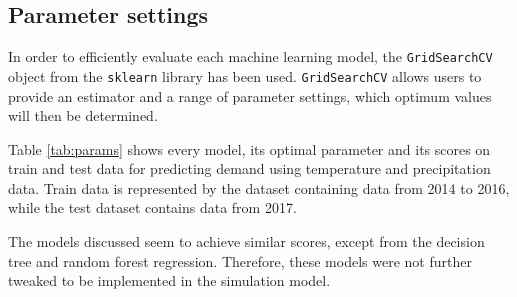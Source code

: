 \documentclass[final,authoryear,5p,times,twocolumn, 11pt]{elsarticle}
\begin{document}
\subsection{Parameter settings}
In order to efficiently evaluate each machine learning model, the \texttt{GridSearchCV} object from the \texttt{sklearn} library has been used. \texttt{GridSearchCV} allows users to provide an estimator and a range of parameter settings, which optimum values will then be determined. 

Table \ref{tab:params} shows every model, its optimal parameter and its scores on train and test data for predicting demand using temperature and precipitation data. Train data is represented by the dataset containing data from 2014 to 2016, while the test dataset contains data from 2017. 

The models discussed seem to achieve similar scores, except from the decision tree and random forest regression. Therefore, these models were not further tweaked to be implemented in the simulation model.
\end{document}

